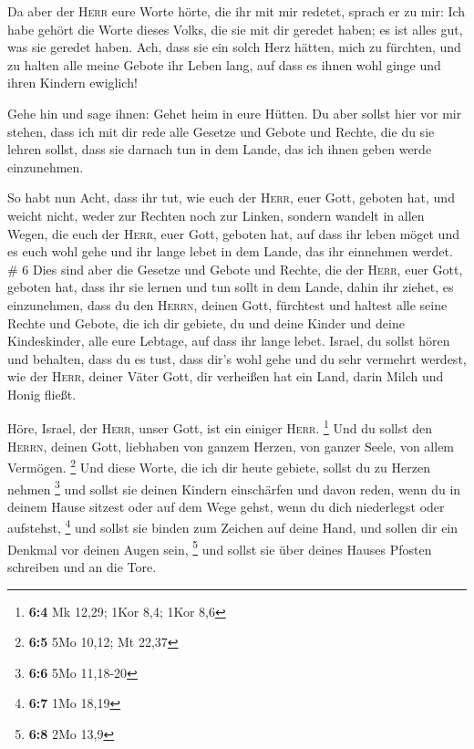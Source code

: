  Da aber der \textsc{Herr} eure Worte hörte, die ihr mit
mir redetet, sprach er zu mir: Ich habe gehört die Worte dieses Volks,
die sie mit dir geredet haben; es ist alles gut, was sie geredet haben.
 Ach, dass sie ein solch Herz hätten, mich zu fürchten,
und zu halten alle meine Gebote ihr Leben lang, auf dass es ihnen wohl
ginge und ihren Kindern ewiglich!

 Gehe hin und sage ihnen: Gehet heim in eure Hütten.
 Du aber sollst hier vor mir stehen, dass ich mit dir
rede alle Gesetze und Gebote und Rechte, die du sie lehren sollst, dass
sie darnach tun in dem Lande, das ich ihnen geben werde einzunehmen.

 So habt nun Acht, dass ihr tut, wie euch der
\textsc{Herr}, euer Gott, geboten hat, und weicht nicht, weder zur
Rechten noch zur Linken,  sondern wandelt in allen Wegen,
die euch der \textsc{Herr}, euer Gott, geboten hat, auf dass ihr leben
möget und es euch wohl gehe und ihr lange lebet in dem Lande, das ihr
einnehmen werdet. \# 6  Dies sind aber die Gesetze und
Gebote und Rechte, die der \textsc{Herr}, euer Gott, geboten hat, dass
ihr sie lernen und tun sollt in dem Lande, dahin ihr ziehet, es
einzunehmen,  dass du den \textsc{Herrn}, deinen Gott,
fürchtest und haltest alle seine Rechte und Gebote, die ich dir gebiete,
du und deine Kinder und deine Kindeskinder, alle eure Lebtage, auf dass
ihr lange lebet.  Israel, du sollst hören und behalten,
dass du es tust, dass dir's wohl gehe und du sehr vermehrt werdest, wie
der \textsc{Herr}, deiner Väter Gott, dir verheißen hat ein Land, darin
Milch und Honig fließt.

 Höre, Israel, der \textsc{Herr}, unser Gott, ist ein
einiger \textsc{Herr}. \footnote{\textbf{6:4} Mk 12,29; 1Kor 8,4; 1Kor
  8,6}  Und du sollst den \textsc{Herrn}, deinen Gott,
liebhaben von ganzem Herzen, von ganzer Seele, von allem Vermögen.
\footnote{\textbf{6:5} 5Mo 10,12; Mt 22,37}  Und diese
Worte, die ich dir heute gebiete, sollst du zu Herzen nehmen \footnote{\textbf{6:6}
  5Mo 11,18-20}  und sollst sie deinen Kindern einschärfen
und davon reden, wenn du in deinem Hause sitzest oder auf dem Wege
gehst, wenn du dich niederlegst oder aufstehst, \footnote{\textbf{6:7}
  1Mo 18,19}  und sollst sie binden zum Zeichen auf deine
Hand, und sollen dir ein Denkmal vor deinen Augen sein, \footnote{\textbf{6:8}
  2Mo 13,9}  und sollst sie über deines Hauses Pfosten
schreiben und an die Tore.

